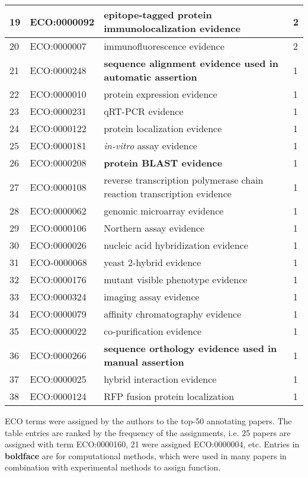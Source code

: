 \begin{longtable}[!ht]{|l||l|p{8cm}|l|}
19 & ECO:0000092 & epitope-tagged protein immunolocalization evidence & 2\\ \hline
20 & ECO:0000007 & immunofluorescence evidence & 2\\ \hline
21 & ECO:0000248 & \textbf{sequence alignment evidence used in automatic assertion} & 1\\ \hline
22 & ECO:0000010 & protein expression evidence & 1\\ \hline
23 & ECO:0000231 & qRT-PCR evidence & 1\\ \hline
24 & ECO:0000122 & protein localization evidence & 1\\ \hline
25 & ECO:0000181 & \textit{in-vitro} assay evidence & 1\\ \hline
26 & ECO:0000208 & \textbf{protein BLAST evidence} & 1\\ \hline
27 & ECO:0000108 & reverse transcription polymerase chain reaction transcription evidence & 1\\ \hline
28 & ECO:0000062 & genomic microarray evidence & 1\\ \hline
29 & ECO:0000106 & Northern assay evidence & 1\\ \hline
30 & ECO:0000026 & nucleic acid hybridization evidence & 1\\ \hline
31 & ECO-0000068 & yeast 2-hybrid evidence & 1\\ \hline
32 & ECO:0000176 & mutant visible phenotype evidence & 1\\ \hline
33 & ECO:0000324 & imaging assay evidence & 1\\ \hline
34 & ECO:0000079 & affinity chromatography evidence & 1\\ \hline
35 & ECO:0000022 & co-purification evidence & 1\\ \hline
36 & ECO:0000266 & \textbf{sequence orthology evidence used in manual assertion} & 1\\ \hline
37 & ECO:0000025 & hybrid interaction evidence & 1\\ \hline
38 & ECO:0000124 & RFP fusion protein localization & 1\\ \hline
\end{longtable}
\label{tab:assertion}
\begin{flushleft} ECO terms were assigned by the authors to the top-50 annotating papers. The table entries are
ranked by the frequency of the assignments, i.e. 25 papers are assigned with term ECO:0000160, 21 were
assigned ECO:0000004, etc. Entries in \textbf{boldface} are for computational methods, which were used in
many papers in combination with experimental methods to assign function. 
\end{flushleft}
